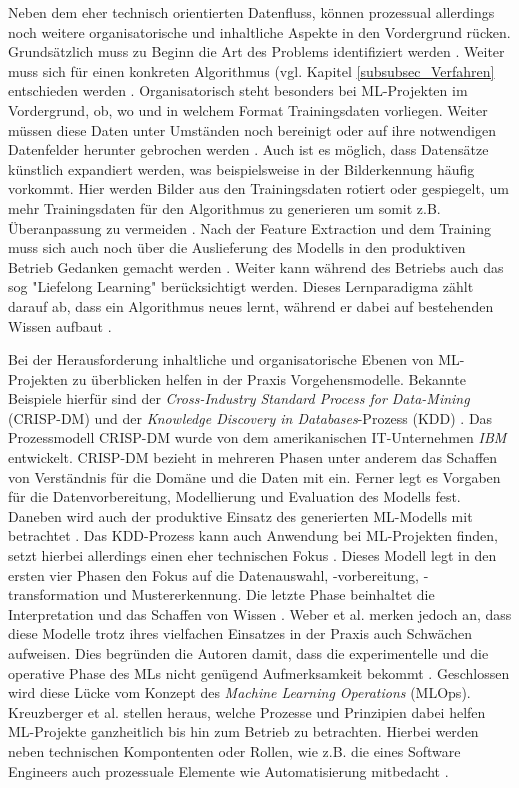 Neben dem eher technisch orientierten Datenfluss, können prozessual allerdings noch weitere organisatorische und inhaltliche Aspekte in den Vordergrund rücken. Grundsätzlich muss zu Beginn die Art des Problems identifiziert werden \cite{Verdhan.2020}. Weiter muss sich für einen konkreten Algorithmus (vgl. Kapitel \ref{subsubsec_Verfahren} entschieden werden \cite{ayodele}. Organisatorisch steht besonders bei ML-Projekten im Vordergrund, ob, wo und in welchem Format Trainingsdaten vorliegen. Weiter müssen diese Daten unter Umständen noch bereinigt oder auf ihre notwendigen Datenfelder herunter gebrochen werden \cite{Verdhan.2020}. Auch ist es möglich, dass Datensätze künstlich expandiert werden, was beispielsweise in der Bilderkennung häufig vorkommt. Hier werden Bilder aus den Trainingsdaten rotiert oder gespiegelt, um mehr Trainingsdaten für den Algorithmus zu generieren um somit z.B. Überanpassung zu vermeiden \cite{mikolajczyk2018data}. Nach der Feature Extraction und dem Training muss sich auch noch über die Auslieferung des Modells in den produktiven Betrieb Gedanken gemacht werden \cite{Verdhan.2020}. Weiter kann während des Betriebs auch das sog "Liefelong Learning" berücksichtigt werden. Dieses Lernparadigma zählt darauf ab, dass ein Algorithmus neues lernt, während er dabei auf bestehenden Wissen aufbaut \cite{chen2018lifelong}.

Bei der Herausforderung inhaltliche und organisatorische Ebenen von ML-Projekten zu überblicken helfen in der Praxis Vorgehensmodelle. Bekannte Beispiele hierfür sind der \emph{Cross-Industry Standard Process for Data-Mining} (CRISP-DM) und der \emph{Knowledge Discovery in Databases}-Prozess (KDD) \cite{weber2019new}. Das Prozessmodell CRISP-DM wurde von dem amerikanischen IT-Unternehmen \emph{IBM} entwickelt. CRISP-DM bezieht in mehreren Phasen unter anderem das Schaffen von Verständnis für die Domäne und die Daten mit ein. Ferner legt es Vorgaben für die Datenvorbereitung, Modellierung und Evaluation des Modells fest. Daneben wird auch der produktive Einsatz des generierten ML-Modells mit betrachtet \cite{IBMCRISP}. Das KDD-Prozess kann auch Anwendung bei ML-Projekten finden, setzt hierbei allerdings einen eher technischen Fokus \cite{weber2019new, fayyad1996data}. Dieses Modell legt in den ersten vier Phasen den Fokus auf die Datenauswahl, -vorbereitung, -transformation und Mustererkennung. Die letzte Phase beinhaltet die Interpretation und das Schaffen von Wissen \cite{fayyad1996data}. Weber et al. \cite{weber2019new} merken jedoch an, dass diese Modelle trotz ihres vielfachen Einsatzes in der Praxis auch Schwächen aufweisen. Dies begründen die Autoren damit, dass die experimentelle und die operative Phase des MLs nicht genügend Aufmerksamkeit bekommt \cite{weber2019new}. Geschlossen wird diese Lücke vom Konzept des \emph{Machine Learning Operations} (MLOps). Kreuzberger et al. \cite{kreuzberger2022machine} stellen heraus, welche Prozesse und Prinzipien dabei helfen ML-Projekte ganzheitlich bis hin zum Betrieb zu betrachten. Hierbei werden neben technischen Kompontenten oder Rollen, wie z.B. die eines Software Engineers auch prozessuale Elemente wie Automatisierung mitbedacht \cite{kreuzberger2022machine}.